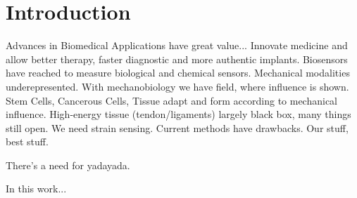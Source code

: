 \section{Introduction}


Advances in Biomedical Applications have great value... Innovate medicine and allow better therapy, faster diagnostic and more authentic implants. Biosensors have reached to measure biological and chemical sensors. Mechanical modalities underepresented. With mechanobiology we have field, where influence is shown. Stem Cells, Cancerous Cells, Tissue adapt and form according to mechanical influence. High-energy tissue (tendon/ligaments) largely black box, many things still open. We need strain sensing. Current methods have drawbacks. Our stuff, best stuff. 

There's a need for yadayada.

In this work...